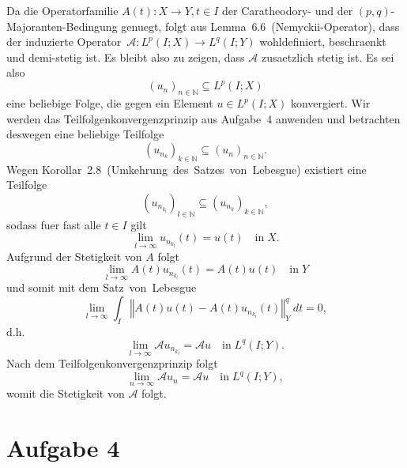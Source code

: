 \documentclass{article}
\begin{document}
Da die Operatorfamilie $A(t): X \rightarrow Y, t \in I$ der Caratheodory- und der $(p,q)$-Majoranten-Bedingung genuegt, folgt aus Lemma~6.6~(Nemyckii-Operator), dass der induzierte Operator~$\mathcal{A}: L^p(I; X) \rightarrow L^q(I; Y)$ wohldefiniert, beschraenkt und demi-stetig ist. Es bleibt also zu zeigen, dass $\mathcal{A}$ zusaetzlich stetig ist. Es sei also 
\begin{equation*}
  (u_n)_{n \in \mathbb{N}} \subseteq L^p(I; X)
\end{equation*}
 eine beliebige Folge, die gegen ein Element $u \in L^p(I; X)$ konvergiert. Wir werden das Teilfolgenkonvergenzprinzip aus Aufgabe~4 anwenden und betrachten deswegen eine beliebige Teilfolge
 \begin{equation*}
  \left(u_{n_k}\right)_{k \in \mathbb{N}} \subseteq (u_n)_{n \in \mathbb{N}}.
\end{equation*}
Wegen Korollar~2.8~(Umkehrung~des~Satzes~von~Lebesgue) existiert eine Teilfolge
\begin{equation*}
  \left(u_{n_{k_l}}\right)_{l \in \mathbb{N}} \subseteq \left(u_{n_k}\right)_{k \in \mathbb{N}},
\end{equation*}
sodass fuer fast alle $t \in I$ gilt
\begin{equation*}
  \lim_{l \rightarrow \infty} u_{n_{k_l}}(t) = u(t) \quad \text{in} \; X.
\end{equation*}
Aufgrund der Stetigkeit von $A$ folgt
\begin{equation*}
  \lim_{l \rightarrow \infty} A(t)u_{n_{k_l}}(t) = A(t)u(t) \quad \text{in} \; Y
\end{equation*}
und somit mit dem Satz~von~Lebesgue
\begin{equation*}
  \lim_{l \rightarrow \infty} \int_{I} \left\Vert A(t)u(t) - A(t)u_{n_{k_l}}(t) \right\Vert_Y^q \ dt 
  = 0,
\end{equation*}
d.h.\ 
\begin{equation*}
  \lim_{l \rightarrow \infty} \mathcal{A} u_{n_{k_l}}
  = \mathcal{A} u \quad \text{in} \; L^q(I; Y).
\end{equation*}
Nach dem Teilfolgenkonvergenzprinzip folgt
\begin{equation*}
  \lim_{n \rightarrow \infty} \mathcal{A} u_{n}
  = \mathcal{A} u \quad \text{in} \; L^q(I; Y),
\end{equation*}
womit die Stetigkeit von $\mathcal{A}$ folgt.

\section*{Aufgabe 4}
\end{document}
